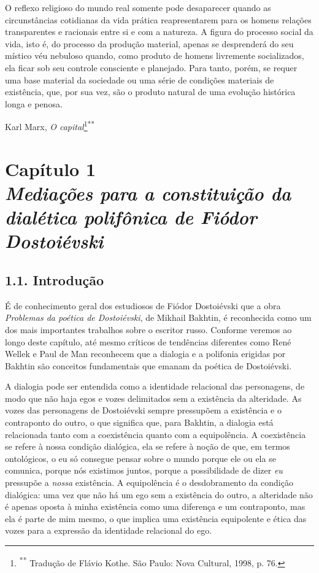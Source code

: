 O reflexo religioso do mundo real somente pode desaparecer quando as
circunstâncias cotidianas da vida prática reapresentarem para os homens
relações transparentes e racionais entre si e com a natureza. A figura
do processo social da vida, isto é, do processo da produção material,
apenas se desprenderá do seu místico véu nebuloso quando, como produto
de homens livremente socializados, ela ficar sob seu controle consciente
e planejado. Para tanto, porém, se requer uma base material da sociedade
ou uma série de condições materiais de existência, que, por sua vez, são
o produto natural de uma evolução histórica longa e penosa.

Karl Marx, \emph{O capital}\footnote{\textsuperscript{**} Tradução de
  Flávio Kothe. São Paulo: Nova Cultural, 1998, p. 76.}\textsuperscript{**}

\chapter*{Capítulo 1\\
\bigskip
\emph{Mediações para a constituição da dialética polifônica de Fiódor
Dostoiévski}}


\section{1.1. Introdução}

É de conhecimento geral dos estudiosos de Fiódor Dostoiévski que a obra
\emph{Problemas da poética de Dostoiévski}, de Mikhail Bakhtin, é
reconhecida como um dos mais importantes trabalhos sobre o escritor
russo. Conforme veremos ao longo deste capítulo, até mesmo críticos de
tendências diferentes como René Wellek e Paul de Man reconhecem que a
dialogia e a polifonia erigidas por Bakhtin são conceitos fundamentais
que emanam da poética de Dostoiévski.

A dialogia pode ser entendida como a identidade relacional das
personagens, de modo que não haja egos e vozes delimitados sem a
existência da alteridade. As vozes das personagens de Dostoiévski sempre
pressupõem a existência e o contraponto do outro, o que significa que,
para Bakhtin, a dialogia está relacionada tanto com a coexistência
quanto com a equipolência. A coexistência se refere à nossa condição
dialógica, ela se refere à noção de que, em termos ontológicos, o eu só
consegue pensar sobre o mundo porque ele ou ela se comunica, porque nós
existimos juntos, porque a possibilidade de dizer \emph{eu} pressupõe a
\emph{nossa} existência. A equipolência é o desdobramento da condição
dialógica: uma vez que não há um ego sem a existência do outro, a
alteridade não é apenas oposta à minha existência como uma diferença e
um contraponto, mas ela é parte de mim mesmo, o que implica uma
existência equipolente e ética das vozes para a expressão da identidade
relacional do ego.


